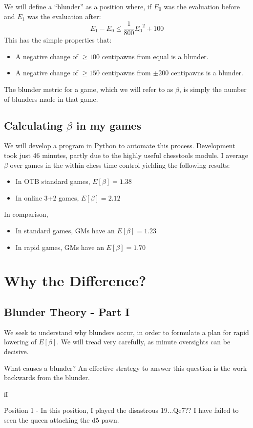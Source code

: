 \documentclass{article}
\newcommand{\cb}[2][]{
  {
  \par
  \centering
  \if#1f
    {\chessboard[setfen=#2, inverse]}
  \else
    \chessboard[setfen=#2]
  \fi
  \par
  }
}
\begin{document}
We will define a ``blunder'' as a position where, if $E_0$ was the evaluation before and $E_1$ was the evaluation after:
\[E_1-E_0\leq \frac{1}{800}{E_0}^2+100\]
This has the simple properties that:
\begin{itemize}
  \item A negative change of $\geq100$ centipawns from equal is a blunder.
  \item A negative change of $\geq150$ centipawns from $\pm200$ centipawns is a blunder.
\end{itemize}
The blunder metric for a game, which we will refer to as $\beta$, is simply the number of blunders made in that game.

\subsection{Calculating $\beta$ in my games}
We will develop a program in Python to automate this process. Development took just 46 minutes, partly due to the highly useful chesstools module. I average $\beta$ over games in the within chess time control yielding the following results:
\begin{itemize}
  \item In OTB standard games, $E[\beta]=1.38$
  \item In online 3+2 games, $E[\beta]=2.12$
\end{itemize}

In comparison, 
\begin{itemize}
  \item In standard games, GMs have an $E[\beta]=1.23$
  \item In rapid games, GMs have an $E[\beta]=1.70$
\end{itemize}

\section{Why the Difference?}
\subsection{Blunder Theory - Part I}
We seek to understand why blunders occur, in order to formulate a plan for rapid lowering of $E[\beta]$. We will tread very carefully, as minute oversights can be decisive.

What causes a blunder? An effective strategy to answer this question is the work backwards from the blunder.
\cb[f]{r2qr1k1/1b4pp/ppn2p2/3p3Q/B1pPn2N/P1P1P2P/1B3PP1/3R1RK1 b - - 0 19}
Position 1 - In this position, I played the disastrous 19...Qe7?? I have failed to seen the queen attacking the d5 pawn.
\end{document}
